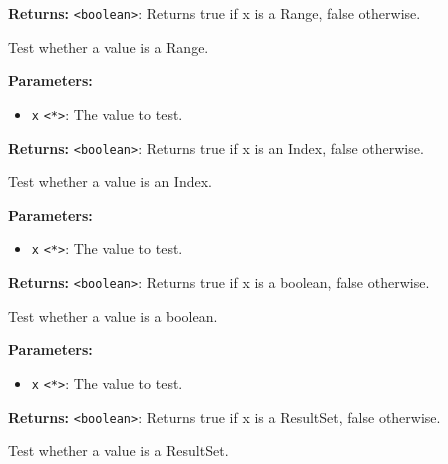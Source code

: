 \documentclass[12pt,a4paper]{article}
\begin{document}
\noindent \textbf{Returns:} \texttt{<boolean>}: Returns true if \textasciigrave{}x\textasciigrave{} is a Range, false otherwise.

\noindent Test whether a value is a Range.

\vspace{5mm}
\noindent {}


\noindent \textbf{Parameters:}
\begin{itemize}
  \item \texttt{x} \texttt{<*>}: The value to test.
\end{itemize}

\noindent \textbf{Returns:} \texttt{<boolean>}: Returns true if \textasciigrave{}x\textasciigrave{} is an Index, false otherwise.

\noindent Test whether a value is an Index.

\vspace{5mm}
\noindent {}


\noindent \textbf{Parameters:}
\begin{itemize}
  \item \texttt{x} \texttt{<*>}: The value to test.
\end{itemize}

\noindent \textbf{Returns:} \texttt{<boolean>}: Returns true if \textasciigrave{}x\textasciigrave{} is a boolean, false otherwise.

\noindent Test whether a value is a boolean.

\vspace{5mm}
\noindent {}


\noindent \textbf{Parameters:}
\begin{itemize}
  \item \texttt{x} \texttt{<*>}: The value to test.
\end{itemize}

\noindent \textbf{Returns:} \texttt{<boolean>}: Returns true if \textasciigrave{}x\textasciigrave{} is a ResultSet, false otherwise.

\noindent Test whether a value is a ResultSet.
\end{document}
